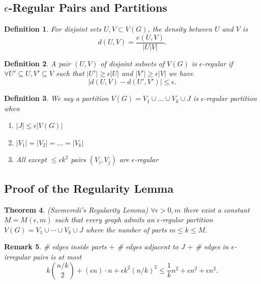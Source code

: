 \documentclass[a4paper]{article}
\newtheorem{thm}{Theorem}[section]
\newtheorem{defn}[thm]{Definition}
\newtheorem{rmk}[thm]{Remark}
\begin{document}
\subsection{$\epsilon$-Regular Pairs and Partitions}
\begin{defn}
    For disjoint sets $U,V\subset V(G)$, the density between $U$ and $V$ is \[
    d(U,V)=\frac{e(U,V)}{|U|V|}
    .\] 
\end{defn}
\begin{defn}
    A pair $(U,V)$ of disjoint subsets of $V(G)$ is $\epsilon$-regular if $\forall U'\subseteq U, V'\subseteq V$ such that $|U'|\geq \epsilon |U|$ and $|V'|\geq \epsilon |V|$ we have 
    \[
    |d(U,V)-d(U',V')|\leq \epsilon
    .\] 
\end{defn}
\begin{defn}
    We say a partition $V(G)=V_1\cup ...\cup V_k\cup J$ is $\epsilon$-regular partition when
    \begin{enumerate}
        \item $|J|\leq \epsilon |V(G)|$
        \item $|V_1|=|V_2|=...=|V_k|$
        \item All except $\leq \epsilon k^2$ pairs $(V_i,V_j)$ are $\epsilon$-regular 
    \end{enumerate}
\end{defn}

\subsection{Proof of the Regularity Lemma}

\begin{thm}
    (Szemeredi's Regularity Lemma) $\forall \epsilon>0,m$ there exist a constant $M=M(\epsilon,m)$ such that every graph admits an $\epsilon$-regular partition $V(G)=V_1\cup \cdots \cup V_k\cup J$ where the number of parts $m\leq k \leq M$. 
\end{thm}
\begin{rmk}
    \# edges inside parts $+$ \# edges adjacent to $J$ $+$ \# edges in $\epsilon$-irregular pairs is at most \[
    k {n/k \choose 2} + (\epsilon n) \cdot n +\epsilon k^2 (n/k)^2\leq \frac{1}{k}n^2+\epsilon n^2+\epsilon n^2
    .\]
\end{rmk}
\end{document}
